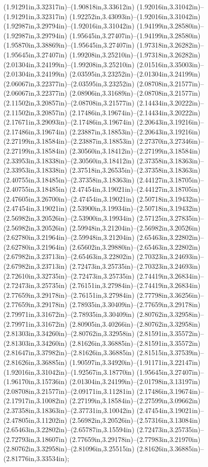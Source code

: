(1.91291in,3.32317in)--(1.90818in,3.33612in) (1.92016in,3.31042in)--(1.91291in,3.32317in) (1.92252in,3.43093in)--(1.92016in,3.31042in) (1.92987in,3.29794in)--(1.92016in,3.31042in) (1.94199in,3.28580in)--(1.92987in,3.29794in) (1.95645in,3.27407in)--(1.94199in,3.28580in) (1.95870in,3.38869in)--(1.95645in,3.27407in) (1.97318in,3.26282in)--(1.95645in,3.27407in) (1.99208in,3.25210in)--(1.97318in,3.26282in) (2.01304in,3.24199in)--(1.99208in,3.25210in) (2.01516in,3.35003in)--(2.01304in,3.24199in) (2.03595in,3.23252in)--(2.01304in,3.24199in) (2.06067in,3.22377in)--(2.03595in,3.23252in) (2.08708in,3.21577in)--(2.06067in,3.22377in) (2.08906in,3.31689in)--(2.08708in,3.21577in) (2.11502in,3.20857in)--(2.08708in,3.21577in) (2.14434in,3.20222in)--(2.11502in,3.20857in) (2.17486in,3.19674in)--(2.14434in,3.20222in) (2.17671in,3.29093in)--(2.17486in,3.19674in) (2.20643in,3.19216in)--(2.17486in,3.19674in) (2.23887in,3.18853in)--(2.20643in,3.19216in) (2.27199in,3.18584in)--(2.23887in,3.18853in) (2.27370in,3.27346in)--(2.27199in,3.18584in) (2.30560in,3.18412in)--(2.27199in,3.18584in) (2.33953in,3.18338in)--(2.30560in,3.18412in) (2.37358in,3.18363in)--(2.33953in,3.18338in) (2.37518in,3.26535in)--(2.37358in,3.18363in) (2.40755in,3.18485in)--(2.37358in,3.18363in) (2.44127in,3.18705in)--(2.40755in,3.18485in) (2.47454in,3.19021in)--(2.44127in,3.18705in) (2.47605in,3.26700in)--(2.47454in,3.19021in) (2.50718in,3.19432in)--(2.47454in,3.19021in) (2.53900in,3.19934in)--(2.50718in,3.19432in) (2.56982in,3.20526in)--(2.53900in,3.19934in) (2.57125in,3.27835in)--(2.56982in,3.20526in) (2.59948in,3.21204in)--(2.56982in,3.20526in) (2.62780in,3.21964in)--(2.59948in,3.21204in) (2.65463in,3.22802in)--(2.62780in,3.21964in) (2.65602in,3.29880in)--(2.65463in,3.22802in) (2.67982in,3.23713in)--(2.65463in,3.22802in) (2.70323in,3.24693in)--(2.67982in,3.23713in) (2.72473in,3.25735in)--(2.70323in,3.24693in) (2.72610in,3.32735in)--(2.72473in,3.25735in) (2.74419in,3.26834in)--(2.72473in,3.25735in) (2.76151in,3.27984in)--(2.74419in,3.26834in) (2.77659in,3.29178in)--(2.76151in,3.27984in) (2.77798in,3.36256in)--(2.77659in,3.29178in) (2.78935in,3.30409in)--(2.77659in,3.29178in) (2.79971in,3.31672in)--(2.78935in,3.30409in) (2.80762in,3.32958in)--(2.79971in,3.31672in) (2.80905in,3.40266in)--(2.80762in,3.32958in) (2.81303in,3.34260in)--(2.80762in,3.32958in) (2.81591in,3.35572in)--(2.81303in,3.34260in) (2.81626in,3.36885in)--(2.81591in,3.35572in) (2.81647in,3.37982in)--(2.81626in,3.36885in) (2.81515in,3.37539in)--(2.81626in,3.36885in) (1.90597in,3.34920in)--(1.91171in,3.22147in) (1.92016in,3.31042in)--(1.92567in,3.18770in) (1.95645in,3.27407in)--(1.96170in,3.15736in) (2.01304in,3.24199in)--(2.01798in,3.13197in) (2.08708in,3.21577in)--(2.09171in,3.11281in) (2.17486in,3.19674in)--(2.17917in,3.10082in) (2.27199in,3.18584in)--(2.27599in,3.09662in) (2.37358in,3.18363in)--(2.37731in,3.10042in) (2.47454in,3.19021in)--(2.47805in,3.11202in) (2.56982in,3.20526in)--(2.57316in,3.13084in) (2.65463in,3.22802in)--(2.65787in,3.15594in) (2.72473in,3.25735in)--(2.72793in,3.18607in) (2.77659in,3.29178in)--(2.77983in,3.21970in) (2.80762in,3.32958in)--(2.81096in,3.25515in) (2.81626in,3.36885in)--(2.81776in,3.33534in);

